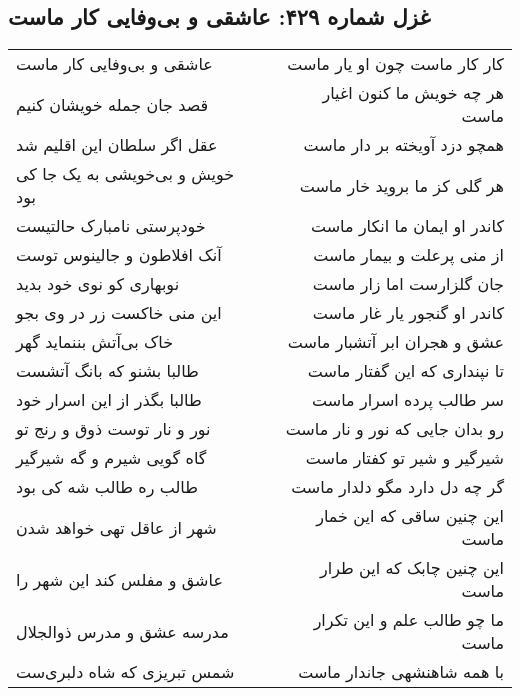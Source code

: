 \begin{center}
\section*{غزل شماره ۴۲۹: عاشقی و بی‌وفایی کار ماست}
\label{sec:0429}
\begin{longtable}{l p{0.5cm} r}
عاشقی و بی‌وفایی کار ماست
&&
کار کار ماست چون او یار ماست
\\
قصد جان جمله خویشان کنیم
&&
هر چه خویش ما کنون اغیار ماست
\\
عقل اگر سلطان این اقلیم شد
&&
همچو دزد آویخته بر دار ماست
\\
خویش و بی‌خویشی به یک جا کی بود
&&
هر گلی کز ما بروید خار ماست
\\
خودپرستی نامبارک حالتیست
&&
کاندر او ایمان ما انکار ماست
\\
آنک افلاطون و جالینوس توست
&&
از منی پرعلت و بیمار ماست
\\
نوبهاری کو نوی خود بدید
&&
جان گلزارست اما زار ماست
\\
این منی خاکست زر در وی بجو
&&
کاندر او گنجور یار غار ماست
\\
خاک بی‌آتش بننماید گهر
&&
عشق و هجران ابر آتشبار ماست
\\
طالبا بشنو که بانگ آتشست
&&
تا نپنداری که این گفتار ماست
\\
طالبا بگذر از این اسرار خود
&&
سر طالب پرده اسرار ماست
\\
نور و نار توست ذوق و رنج تو
&&
رو بدان جایی که نور و نار ماست
\\
گاه گویی شیرم و گه شیرگیر
&&
شیرگیر و شیر تو کفتار ماست
\\
طالب ره طالب شه کی بود
&&
گر چه دل دارد مگو دلدار ماست
\\
شهر از عاقل تهی خواهد شدن
&&
این چنین ساقی که این خمار ماست
\\
عاشق و مفلس کند این شهر را
&&
این چنین چابک که این طرار ماست
\\
مدرسه عشق و مدرس ذوالجلال
&&
ما چو طالب علم و این تکرار ماست
\\
شمس تبریزی که شاه دلبری‌ست
&&
با همه شاهنشهی جاندار ماست
\\
\end{longtable}
\end{center}
